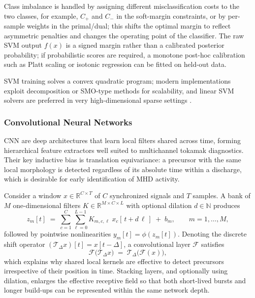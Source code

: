 Class imbalance is handled by assigning different misclassification costs to the two classes, for example, $C_+$ and $C_-$ in the soft-margin constraints, or by per-sample weights in the primal/dual; this shifts the optimal margin to reflect asymmetric penalties and changes the operating point of the classifier. The raw SVM output $f(x)$ is a signed margin rather than a calibrated posterior probability; if probabilistic scores are required, a monotone post-hoc calibration such as Platt scaling or isotonic regression can be fitted on held-out data.

SVM training solves a convex quadratic program; modern implementations exploit decomposition or SMO-type methods for scalability, and linear SVM solvers are preferred in very high-dimensional sparse settings \autocite{cortesSupportvectorNetworks1995b,scholkopfLearningKernelsSupport2001}.



\subsubsection{Convolutional Neural Networks}\label{sec:cnn}

\ac{CNN} are deep architectures that learn local filters shared across time, forming hierarchical feature extractors well suited to multichannel tokamak diagnostics. Their key inductive bias is translation equivariance: a precursor with the same local morphology is detected regardless of its absolute time within a discharge, which is desirable for early identification of \ac{MHD} activity.

Consider a window $x \in \mathbb{R}^{C \times T}$ of $C$ synchronized signals and $T$ samples. A bank of $M$ one-dimensional filters $K \in \mathbb{R}^{M \times C \times L}$ with optional dilation $d \in \mathbb{N}$ produces
\begin{equation}
z_{m}[t] \;=\; \sum_{c=1}^{C}\sum_{\ell=0}^{L-1} K_{m,c,\ell}\; x_{c}[\,t + d\,\ell\,] \;+\; b_{m},
\qquad m=1,\dots,M,
\label{eq:conv1d}
\end{equation}
followed by pointwise nonlinearities $y_m[t]=\phi(z_m[t])$. Denoting the discrete shift operator $(\mathcal{T}_\Delta x)[t]=x[t-\Delta]$, a convolutional layer $\mathcal{F}$ satisfies
\begin{equation}
\mathcal{F}\!\big(\mathcal{T}_\Delta x\big)\;=\;\mathcal{T}_\Delta\!\big(\mathcal{F}(x)\big),
\label{eq:equivariance}
\end{equation}
which explains why shared local kernels are effective to detect precursors irrespective of their position in time. Stacking layers, and optionally using dilation, enlarges the effective receptive field so that both short-lived bursts and longer build-ups can be represented within the same network depth.

